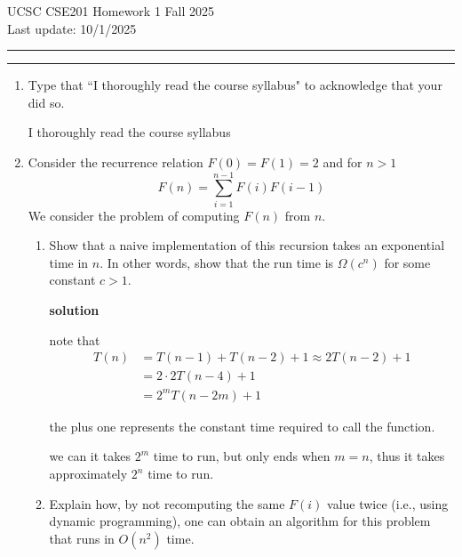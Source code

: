 \documentclass[letterpaper,12pt]{article}
\begin{document}
\noindent
 UCSC CSE201 Homework 1 \hfill Fall 2025 \\
Last update: 10/1/2025 \\
 \rule{\textwidth}{0.5pt}

% 

\enlargethispage*{1.5cm}

\noindent
 \rule{\textwidth}{0.5pt}




\begin{enumerate}

\item Type that ``I thoroughly read the course syllabus" to acknowledge that your did so. 

I thoroughly read the course syllabus

\newpage
\item
Consider the recurrence relation
$F(0)=F(1)=2$ and for $n>1$
$$F(n)= \sum_{i=1}^{n-1} F(i) F(i-1)$$
We consider the problem of computing $F(n)$ from $n$.

\begin{enumerate}


\item
Show that a naive implementation of this recursion takes an exponential time in $n$. In other words,
show that the run time is $\Omega(c^n)$ for some constant $c  > 1$.

\textbf{solution}

note that \begin{equation}\begin{split}
        T(n) &= T(n-1) + T(n-2) +1\approx 2T(n-2)+1\\
        &= 2\cdot 2 T(n-4)+1\\
        &= 2^m T(n-2m)+1
\end{split}
\end{equation}

the plus one represents the constant time required to  call the function.

we can it takes \(2^m\) time to run, but only ends when \(m=n\), thus it takes approximately \(2^n\) time to run.







\item Explain how, by not recomputing the same $F(i)$ value twice (i.e., using dynamic programming),
one can obtain an algorithm for this problem that runs in $O(n^2)$ 
time. 


\end{enumerate}
\end{enumerate}
\end{document}
